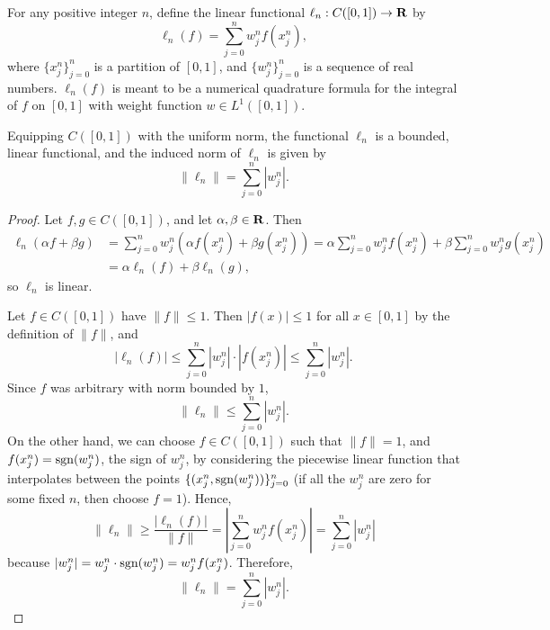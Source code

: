 \documentclass{homework}
\begin{document}
	\question
	For any positive integer $n$, define the linear functional $\ell_n : C([0,1]) \to \textbf{R}$ by
	\begin{equation}
		\ell_n(f) = \sum_{j=0}^n w_j^n f(x_j^n),
	\end{equation}
	where $\{x_j^n\}_{j=0}^n$ is a partition of $[0,1]$, and $\{w_j^n\}_{j=0}^n$ is a sequence of real numbers. $\ell_n(f)$ is meant to be a numerical quadrature formula for the integral of $f$ on $[0,1]$ with weight function $w \in L^1([0,1])$.
	\begin{arabicparts}
		\questionpart 
		Equipping $C([0,1])$ with the uniform norm, the functional $\ell_n$ is a bounded, linear functional, and the induced norm of $\ell_n$ is given by
		\begin{equation}
			\lVert \ell_n \rVert = \sum_{j=0}^n |w_j^n|.
		\end{equation}
		\begin{proof}
			Let $f,g \in C([0,1])$, and let $\alpha,\beta \in \textbf{R}$. Then
			\begin{align}
				\ell_n(\alpha f+ \beta g) &= \sum_{j=0}^n w_j^n(\alpha f(x_j^n) + \beta g(x_j^n)) = \alpha\sum_{j=0}^n w_j^nf(x_j^n) + \beta\sum_{j=0}^n w_j^ng(x_j^n) \\
				&= \alpha\ell_n(f) + \beta\ell_n(g),
			\end{align}
			so $\ell_n$ is linear.
			
			Let $f \in C([0,1])$ have $\lVert f \rVert \le 1$. Then $|f(x)| \le 1$ for all $x \in [0,1]$ by the definition of $\lVert f\rVert$, and
			\begin{equation}
				|\ell_n(f)| \le \sum_{j=0}^n |w_j^n|\cdot|f(x_j^n)| \le \sum_{j=0}^n |w_j^n|.
			\end{equation}
			Since $f$ was arbitrary with norm bounded by $1$,
			\begin{equation}
				\lVert \ell_n\rVert \le \sum_{j=0}^n |w_j^n|.
			\end{equation}
			On the other hand, we can choose $f \in C([0,1])$ such that $\lVert f\rVert = 1$, and $f(x_j^n) = \mathrm{sgn}(w_j^n)$, the sign of $w_j^n$, by considering the piecewise linear function that interpolates between the points $\{(x_j^n, \mathrm{sgn}(w_j^n))\}_{j=0}^n$ (if all the $w_j^n$ are zero for some fixed $n$, then choose $f = 1$). Hence,
			\begin{equation}
				\lVert \ell_n\rVert \ge \frac{|\ell_n(f)|}{\lVert f\rVert} = \left|\sum_{j=0}^n w_j^n f(x_j^n)\right| = \sum_{j=0}^n|w_j^n|
			\end{equation}
			because $|w_j^n| = w_j^n\cdot\mathrm{sgn}(w_j^n) = w_j^nf(x_j^n)$. Therefore,
			\begin{equation}
				\lVert\ell_n\rVert = \sum_{j=0}^n |w_j^n|.
			\end{equation}
		\end{proof}
		

\end{arabicparts}
\end{document}
